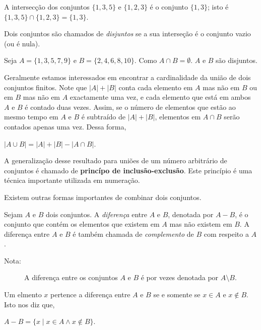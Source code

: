 \begin{exmp}
\label{exem320}
A intersecção dos conjuntos $\{1,3,5\}$ e $\{1,2,3\}$ é o conjunto $\{1,3\}$;
isto é $\{1,3,5\} \cap \{1,2,3\} = \{1,3\}$.
\end{exmp}

\begin{defn}
\label{def312}
Dois conjuntos são chamados de \emph{disjuntos} se a sua interseção é o conjunto
vazio (ou é nula).
\end{defn}

\begin{exmp}
\label{exem321}
Seja $A = \{1,3,5,7,9\}$ e $B = \{2,4,6,8,10\}$. Como $A \cap B = \emptyset$.
$A$ e $B$ são disjuntos.
\end{exmp}

Geralmente estamos interessados em encontrar a cardinalidade da união de dois
conjuntos finitos. Note que $|A| + |B|$ conta cada elemento em $A$ mas não em
$B$ ou em $B$ mas não em $A$ exactamente uma vez, e cada elemento que está em
ambos $A$ e $B$ é contado duas vezes. Assim, se o número de elementos que estão
ao mesmo tempo em $A$ e $B$ é subtraído de $|A|+|B|$, elementos em $A \cap B$
serão contados apenas uma vez. Dessa forma,
\begin{center}
$|A \cup B| = |A|+|B| - |A \cap B|$.
\end{center}

A generalização desse resultado para uniões de um número arbitrário de conjuntos
é chamado de \textbf{princípo de inclusão-exclusão}. Este princípio é
uma técnica importante utilizada em numeração.

Existem outras formas importantes de combinar dois conjuntos.

\begin{defn}
\label{def313}
Sejam $A$ e $B$ dois conjuntos. A \emph{diferença} entre $A$ e $B$, denotada por
$A - B$, é o conjunto que contém os elementos que existem em $A$ mas não existem
em $B$. A diferença entre $A$ e $B$ é também chamada de \emph{complemento} de
$B$ com respeito a $A$.
\end{defn}

\begin{description}
\item[Nota:] A diferença entre os conjuntos $A$ e $B$ é por vezes denotada por
$A\setminus B$.
\end{description}

Um elmento $x$ pertence a diferença entre $A$ e $B$ se e somente se $x \in A$ e
$x \notin B$. Isto nos diz que,
\begin{center}
$A - B = \{x \mid x \in A \land x \notin B\}$.
\end{center}

